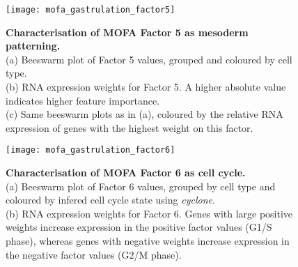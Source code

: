\begin{figure}[H]
	\centering
	\texttt{[image: mofa\_gastrulation\_factor5]}
	\caption[]{\textbf{Characterisation of MOFA Factor 5 as mesoderm patterning.} \\
	(a) Beeswarm plot of Factor 5 values, grouped and coloured by cell type. \\
	(b) RNA expression weights for Factor 5. A higher absolute value indicates higher feature importance.\\
	(c) Same beeswarm plots as in (a), coloured by the relative RNA expression of genes with the highest weight on this factor.}
	\label{fig:mofa_gastrulation_factor5}
\end{figure}


\begin{figure}[H]
	\centering
	\texttt{[image: mofa\_gastrulation\_factor6]}
	\caption[]{\textbf{Characterisation of MOFA Factor 6 as cell cycle.} \\
	(a) Beeswarm plot of Factor 6 values, grouped by cell type and coloured by infered cell cycle state using \textit{cyclone}\cite{Scialdone2015}.\\
	(b) RNA expression weights for Factor 6. Genes with large positive weights increase expression in the positive factor values (G1/S phase), whereas genes with negative weights increase expression in the negative factor values (G2/M phase).}
	\label{fig:mofa_gastrulation_factor6}
\end{figure}
